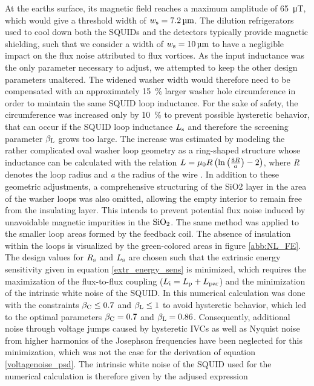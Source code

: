 At the earths surface, its magnetic field reaches a maximum amplitude of \qty{65}{\micro\tesla}, which would give a threshold width of $w_{\rm s}=\qty{7.2}{\micro\meter}$. The dilution refrigerators used to cool down both the SQUIDs and the detectors typically provide magnetic shielding, such that we consider a width of $w_{\rm s}=\qty{10}{\micro\meter}$ to have a negligible impact on the flux noise attributed to flux vortices. As the input inductance was the only parameter necessary to adjust, we attempted to keep the other design parameters unaltered. The widened washer width would therefore need to be compensated with an approximately \qty{15}{\%} larger washer hole circumference in order to maintain the same SQUID loop inductance. For the sake of safety, the circumference was increased only by \qty{10}{\%} to prevent possible hysteretic behavior, that can occur if the SQUID loop inductance $L_{\rm s}$ and therefore the screening parameter $\beta_{\rm L}$ grows too large. The increase was estimated by modeling the rather complicated oval washer loop geometry as a ring-shaped structure whose inductance can be calculated with the relation $L={\rm \mu_0}R\left(\ln\left(\frac{8R}{a}\right)-2\right)$, where \textit{R} denotes the loop radius and \textit{a} the radius of the wire \cite{Dengler2016}. In addition to these geometric adjustments, a comprehensive structuring of the SiO2 layer in the area of the washer loops was also omitted, allowing the empty interior to remain free from the insulating layer. This intends to prevent potential flux noise induced by unavoidable magnetic impurities in the $\rm SiO_2$. The same method was applied to the smaller loop areas formed by the feedback coil. The absence of insulation within the loops is visualized by the green-colored areas in figure \ref{abb:NL_FE}. \\

The design values for $R_{\rm s}$ and $L_{\rm s}$ are chosen such that the extrinsic energy sensitivity given in equation \ref{extr_energy_sens} is minimized, which requires the maximization of the flux-to-flux coupling ($L_{\rm i}=L_{\rm p}+L_{\rm par}$) and the minimization of the intrinsic white noise of the SQUID. In \cite{Bauer2022} this numerical calculation was done with the constraints $\beta_{\rm C}\leq 0.7$ and $\beta_{\rm L}\leq 1$ to avoid hysteretic behavior, which led to the optimal parameters $\beta_{\rm C}=0.7$ and $\beta_{\rm L}=0.86$. Consequently, additional noise through voltage jumps caused by hysteretic IVCs as well as Nyquist noise from higher harmonics of the Josephson frequencies \cite{Clarke1996} have been neglected for this minimization, which was not the case for the derivation of equation \ref{voltagenoise_psd}. The intrinsic white noise of the SQUID used for the numerical calculation is therefore given by the adjused expression \cite{Knuutila1988}

